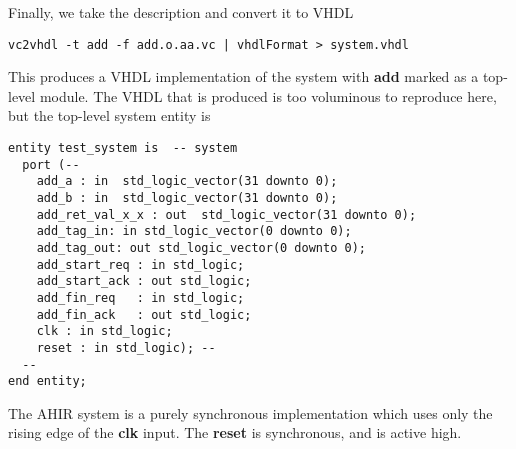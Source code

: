 Finally, we take the \vC description and convert it to
VHDL
\begin{verbatim}
vc2vhdl -t add -f add.o.aa.vc | vhdlFormat > system.vhdl
\end{verbatim}
This produces a VHDL implementation of the system with
{\bf add} marked as a top-level module.  The VHDL that
is produced is too voluminous to reproduce here, but
the top-level system entity is
\begin{verbatim}
entity test_system is  -- system
  port (--
    add_a : in  std_logic_vector(31 downto 0);
    add_b : in  std_logic_vector(31 downto 0);
    add_ret_val_x_x : out  std_logic_vector(31 downto 0);
    add_tag_in: in std_logic_vector(0 downto 0);
    add_tag_out: out std_logic_vector(0 downto 0);
    add_start_req : in std_logic;
    add_start_ack : out std_logic;
    add_fin_req   : in std_logic;
    add_fin_ack   : out std_logic;
    clk : in std_logic;
    reset : in std_logic); --
  --
end entity;
\end{verbatim}

The AHIR system is a purely synchronous implementation
which uses only the rising edge of the {\bf clk} input.
The {\bf reset} is synchronous, and is active high. 

